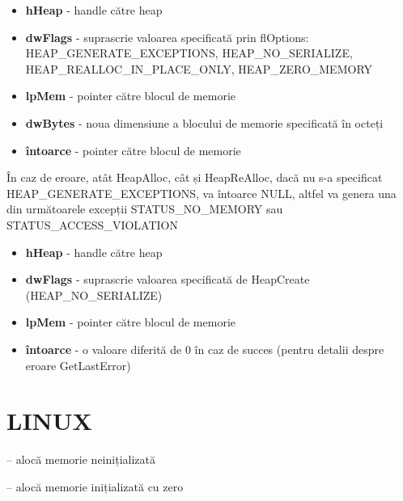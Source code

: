 \documentclass{refcard.cs.pub.ro}
\begin{document}
\begin{multicols*}{3}
\begin{itemize}
  \item \textbf{hHeap} - handle către heap
  \item \textbf{dwFlags} - suprascrie valoarea specificată prin flOptions:
HEAP_GENERATE_EXCEPTIONS, HEAP_NO_SERIALIZE, HEAP_REALLOC_IN_PLACE_ONLY, HEAP_ZERO_MEMORY
  \item \textbf{lpMem} - pointer către blocul de memorie
  \item \textbf{dwBytes} - noua dimensiune a blocului de memorie specificată în octeți
  \item \textbf{întoarce} - pointer către blocul de memorie
\end{itemize}

\columnbreak

În caz de eroare, atât HeapAlloc, cât și HeapReAlloc, dacă nu s-a specificat HEAP_GENERATE_EXCEPTIONS, va întoarce NULL, altfel va genera una din următoarele excepții
STATUS_NO_MEMORY sau STATUS_ACCESS_VIOLATION

\vspace*{0.4cm}

\begin{itemize}
  \item \textbf{hHeap} - handle către heap
  \item \textbf{dwFlags} - suprascrie valoarea specificată de HeapCreate (HEAP_NO_SERIALIZE)
  \item \textbf{lpMem} - pointer către blocul de memorie
  \item \textbf{întoarce} - o valoare diferită de 0 în caz de succes (pentru detalii despre eroare GetLastError)
\end{itemize}

\section{LINUX}

 -- alocă memorie neinițializată
\begin{params}
  \param{}{}
\end{params}

 -- alocă memorie inițializată cu zero
\begin{params}
  \param{}{}
\end{params}


\end{multicols*}
\end{document}
